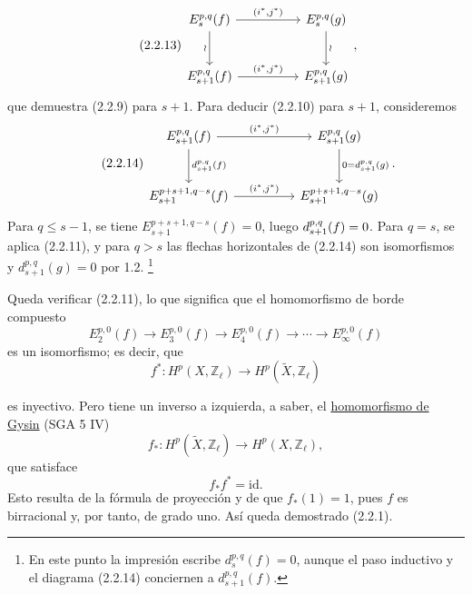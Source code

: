 \begin{equation}\tag{2.2.13}
\begin{tikzcd}[column sep=huge,row sep=large]
E_s^{p,q}(f)
  \arrow[r,"{(i^*,j^*)}"]
  \arrow[d,"\wr"']
&
E_s^{p,q}(g)
  \arrow[d,"\wr"]
\\
E_{s+1}^{p,q}(f)
  \arrow[r,"{(i^*,j^*)}"]
&
E_{s+1}^{p,q}(g)
\end{tikzcd},
\end{equation}
que demuestra (2.2.9) para $s+1$. Para deducir (2.2.10) para
$s+1$, consideremos
\begin{equation}\tag{2.2.14}
\begin{tikzcd}[column sep=huge,row sep=large]
E_{s+1}^{p,q}(f)
  \arrow[r,"{(i^*,j^*)}"]
  \arrow[d,"{d_{s+1}^{p,q}(f)}"]
&
E_{s+1}^{p,q}(g)
  \arrow[d,"{0=d_{s+1}^{p,q}(g)}"]
\\
E_{s+1}^{p+s+1,q-s}(f)
  \arrow[r,"{(i^*,j^*)}"]
&
E_{s+1}^{p+s+1,q-s}(g)
\end{tikzcd}.
\end{equation}
Para $q\leq s-1$, se tiene
$E_{s+1}^{p+s+1,q-s}(f)=0$, luego $d_{\sisi{s}{s+1}}^{p,q}(f)=0$. Para
$q=s$, se aplica (2.2.11), y para $q>s$ las flechas horizontales de
(2.2.14) son isomorfismos y $d_{s+1}^{p,q}(g)=0$ por 1.2.
\footnote{En este punto la impresión escribe $d_s^{p,q}(f)=0$, aunque
el paso inductivo y el diagrama (2.2.14) conciernen a
$d_{s+1}^{p,q}(f)$.}

Queda verificar (2.2.11), lo que significa que el homomorfismo de borde
compuesto
\begin{equation}\tag{2.2.15}
E_2^{p,0}(f)\longrightarrow E_3^{p,0}(f)
\longrightarrow E_4^{p,0}(f)\longrightarrow\cdots
\longrightarrow E_\infty^{p,0}(f)
\end{equation}
es un isomorfismo; es decir, que
\begin{equation}\tag{2.2.16}
f^*:H^p(X,\mathbb Z_\ell)
\longrightarrow H^p(\widetilde X,\mathbb Z_\ell)
\end{equation}

\pageoriginale

es inyectivo. Pero tiene un inverso a izquierda, a saber, el
\underline{homomorfismo de Gysin} (SGA 5 IV)
\begin{equation}\tag{2.2.17}
f_*:H^p(\widetilde X,\mathbb Z_\ell)
\longrightarrow H^p(X,\mathbb Z_\ell),
\end{equation}
que satisface
\begin{equation}\tag{2.2.18}
f_*f^*=\mathrm{id}.
\end{equation}
Esto resulta de la fórmula de proyección y de que $f_*(1)=1$, pues $f$
es birracional y, por tanto, de grado uno. Así queda demostrado (2.2.1).

